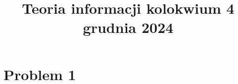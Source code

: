 \documentclass{article}
\title{Teoria informacji kolokwium 4 grudnia 2024}
\begin{document}
\maketitle

\section{Problem 1}
\end{document}
